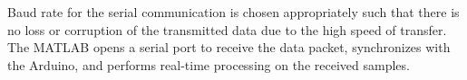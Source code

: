 Baud rate for the serial communication is chosen appropriately such that there is no loss or corruption of the transmitted data due to the high speed of transfer. The MATLAB opens a serial port to receive the data packet, synchronizes with the Arduino, and performs real-time processing on the received samples.




